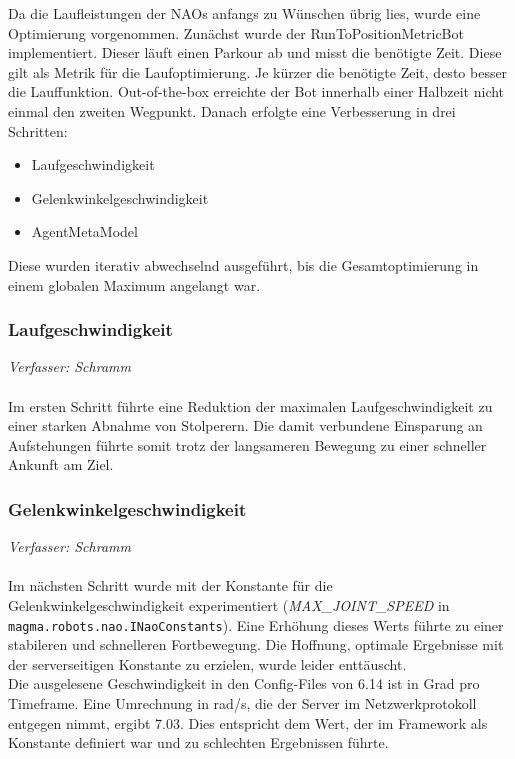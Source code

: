 Da die Laufleistungen der NAOs anfangs zu Wünschen übrig lies, wurde eine Optimierung vorgenommen. Zunächst wurde der RunToPositionMetricBot implementiert. Dieser läuft einen Parkour ab und misst die benötigte Zeit. Diese gilt als Metrik für die Laufoptimierung. Je kürzer die benötigte Zeit, desto besser die Lauffunktion.
Out-of-the-box erreichte der Bot innerhalb einer Halbzeit nicht einmal den zweiten Wegpunkt.
Danach erfolgte eine Verbesserung in drei Schritten:
\begin{itemize}
\item Laufgeschwindigkeit
\item Gelenkwinkelgeschwindigkeit
\item AgentMetaModel
\end{itemize}
Diese wurden iterativ abwechselnd ausgeführt, bis die Gesamtoptimierung in einem globalen Maximum angelangt war.

\subsubsection{Laufgeschwindigkeit}
\textit{Verfasser: Schramm}\\
\\
Im ersten Schritt führte eine Reduktion der maximalen Laufgeschwindigkeit zu einer starken Abnahme von Stolperern. Die damit verbundene Einsparung an Aufstehungen führte somit trotz der langsameren Bewegung zu einer schneller Ankunft am Ziel.

\subsubsection{Gelenkwinkelgeschwindigkeit}
\textit{Verfasser: Schramm}\\
\\
\label{subsubsec:joint-speed}
Im nächsten Schritt wurde mit der Konstante für die Gelenkwinkelgeschwindigkeit experimentiert (\textit{MAX\_JOINT\_SPEED} in  \texttt{magma.robots.nao.INaoConstants}). Eine Erhöhung dieses Werts führte zu einer stabileren und schnelleren Fortbewegung. Die Hoffnung, optimale Ergebnisse mit der serverseitigen Konstante zu erzielen, wurde leider enttäuscht.\\
Die ausgelesene Geschwindigkeit in den Config-Files von 6.14 ist in Grad pro Timeframe. Eine Umrechnung in rad/s, die der Server im Netzwerkprotokoll entgegen nimmt, ergibt 7.03. Dies entspricht dem Wert, der im Framework als Konstante definiert war und zu schlechten Ergebnissen führte.\\

